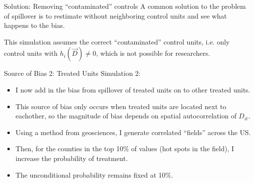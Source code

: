 \documentclass[aspectratio=43]{beamer}
\begin{document}
\begin{frame}{Solution: Removing ``contaminated'' controls}
    A common solution to the problem of spillover is to restimate without neighboring control units and see what happens to the bias.

    This simulation assumes the correct ``contaminated'' control units, i.e. only control units with $h_i(\vec{D}) \neq 0$, which is not possible for researchers.
\end{frame}



\begin{frame}{Source of Bias 2: Treated Units}
    Simulation 2:

    \begin{itemize}
        \item I now add in the bias from spillover of treated units on to other treated units.
        
        \item This source of bias only occurs when treated units are located next to eachother, so the magnitude of bias depends on spatial autocorrelation of $D_{it}$. 
        
        \item Using a method from geosciences, I generate correlated ``fields'' across the US. 
        
        \item Then, for the counties in the top 10\% of values (hot spots in the field), I increase the probability of treatment. 
        
        \item The unconditional probability remains fixed at 10\%.
    \end{itemize}
\end{frame}





\end{document}
